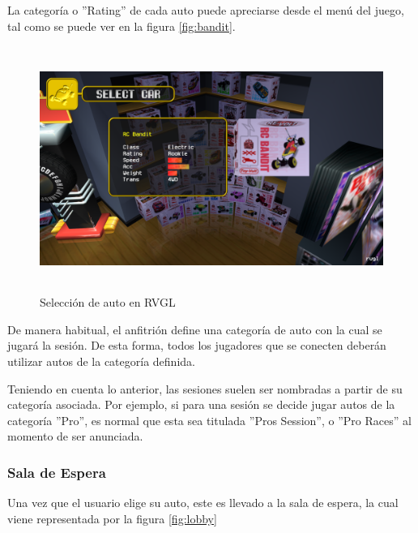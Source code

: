 La categoría o ''Rating'' de cada auto puede apreciarse desde el menú del juego, tal como se puede ver en la figura \autoref{fig:bandit}.

\begin{figure}[H]
  \begin{center}
    \includegraphics[width=15cm, height=8cm]{img/bandit.png}
  \end{center}
  \caption[Selección de auto en RVGL]{Selección de auto en RVGL}
  \label{fig:bandit}
\end{figure}

De manera habitual, el anfitrión define una categoría de auto con la cual se jugará la sesión. De esta forma, todos los jugadores que se conecten deberán utilizar autos de la categoría definida.

Teniendo en cuenta lo anterior, las sesiones suelen ser nombradas a partir de su categoría asociada. Por ejemplo, si para una sesión se decide jugar autos de la categoría ''Pro'', es normal que esta sea titulada  ''Pros Session'', o ''Pro Races'' al momento de ser anunciada.

\subsubsection{Sala de Espera}
Una vez que el usuario elige su auto, este es llevado a la sala de espera, la cual viene representada por la figura \autoref{fig:lobby}


